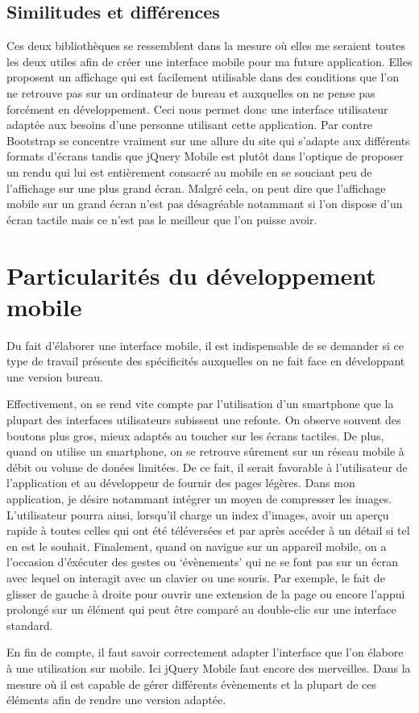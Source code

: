 \documentclass[letterpaper,10pt,french]{sphinxmanual}
\begin{document}
\section{Similitudes et différences}
\label{Diff_xe9rence_jQM_boot:similitudes-et-differences}
Ces deux bibliothèques se ressemblent dans la mesure où elles me seraient toutes
les deux utiles afin de créer une interface mobile pour ma future application.
Elles proposent un affichage qui est facilement utilisable dans des conditions
que l'on ne retrouve pas sur un ordinateur de bureau et auxquelles on ne pense pas
forcément en développement. Ceci nous permet donc une interface utilisateur
adaptée aux besoins d'une personne utilisant cette application.
Par contre Bootstrap se concentre vraiment sur une allure du site qui s'adapte
aux différents formats d'écrans tandis que jQuery Mobile est plutôt dans l'optique
de proposer un rendu qui lui est entièrement consacré au mobile en se souciant peu
de l'affichage sur une plus grand écran. Malgré cela, on peut dire que l'affichage
mobile sur un grand écran n'est pas désagréable notammant si l'on dispose d'un écran
tactile mais ce n'est pas le meilleur que l'on puisse avoir.


\chapter{Particularités du développement mobile}
\label{Particularit_xe9s:particularites-du-developpement-mobile}\label{Particularit_xe9s::doc}
Du fait d'élaborer une interface mobile, il est indispensable  de se demander
si ce type de travail présente des spécificités auxquelles on ne fait face en
développant une version bureau.

Effectivement, on se rend vite compte par l'utilisation d'un smartphone que la
plupart des interfaces utilisateurs subissent une refonte. On observe souvent
des boutons plus gros, mieux adaptés au toucher sur les écrans tactiles.
De plus, quand on utilise un smartphone, on se retrouve sûrement sur un réseau
mobile à débit ou volune de donées limitées. De ce fait, il serait favorable à
l'utilisateur de l'application et au développeur de fournir des pages légères.
Dans mon application, je désire notammant intégrer un moyen de compresser les
images. L'utilisateur pourra ainsi, lorsqu'il charge un index d'images, avoir
un aperçu rapide à toutes celles qui ont été téléversées et par après accéder
à un détail si tel en est le souhait.
Finalement, quand on navigue sur un appareil mobile, on a l'occasion d'éxécuter
des gestes ou `évènements' qui ne se font pas sur un écran avec lequel on interagit
avec un clavier ou une souris. Par exemple, le fait de glisser de gauche à droite
pour ouvrir une extension de la page ou encore l'appui prolongé sur un élément
qui peut être comparé au double-clic sur une interface standard.

En fin de compte, il faut savoir correctement adapter l'interface que l'on élabore
à une utilisation sur mobile. Ici jQuery Mobile faut encore des merveilles. Dans
la mesure où il est capable de gérer différents évènements et la plupart de ces
éléments afin de rendre une version adaptée.



\renewcommand{\indexname}{Index}
\printindex
\end{document}
